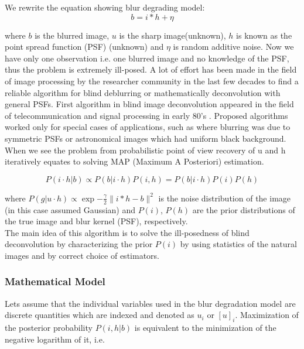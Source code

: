 \documentclass{article}
\begin{document}
We rewrite the equation showing blur degrading model: \\

\begin{equation*}
    b = i * h + \eta
\end{equation*}

where $b$ is the blurred image, $u$ is the sharp image(unknown), $h$ is known as the point spread function (PSF) (unknown) and $\eta$ is random additive noise. Now we have only one observation i.e. one blurred image and no knowledge of the PSF, thus the problem is extremely ill-posed. A lot of effort has been made in the field of image processing by the researcher community in the last few decades to find a reliable algorithm for blind deblurring or mathematically deconvolution with general PSFs. First algorithm in blind image deconvolution appeared in the field of telecommunication and signal processing in early 80’s \cite{6}. Proposed algorithms worked only for special cases of applications, such as where blurring was due to symmetric PSFs or astronomical images which had uniform black background. \\

When we see the problem from probabilistic point of view  recovery of u and h iteratively equates to solving MAP (Maximum A Posteriori) estimation. 

\begin{equation}
    P(i \cdot h | b) \propto P(b | i \cdot h) P(i, h) = P(b | i \cdot h) P(i) P(h)
\end{equation}

where $P(g | u \cdot h) \propto \exp{-\frac{\gamma}{2} \|i * h - b\|^2}$ is the noise distribution of the image (in this case assumed Gaussian) and $P(i)$, $P(h)$ are the prior distributions of the true image and blur kernel (PSF), respectively. \\

The main idea of this algorithm is to solve the ill-posedness of blind deconvolution by characterizing the prior $P(i)$ by using statistics of the natural images and by correct choice of estimators.  

\subsubsection{Mathematical Model}
Lets assume that the individual variables used in the blur degradation model are discrete quantities which are indexed and denoted as $u_i$ or $[u]_i$. Maximization of the posterior probability $P(i,h | b)$ is equivalent to the minimization of the negative logarithm of it, i.e.
\end{document}
